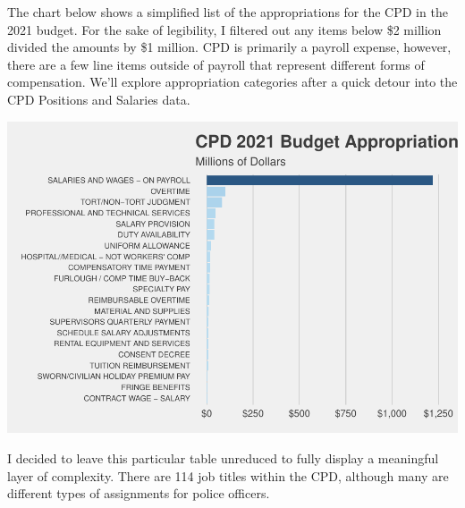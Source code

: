 \documentclass[
]{article}
\begin{document}
The chart below shows a simplified list of the appropriations for the
CPD in the 2021 budget. For the sake of legibility, I filtered out any
items below \$2 million divided the amounts by \$1 million. CPD is
primarily a payroll expense, however, there are a few line items outside
of payroll that represent different forms of compensation. We'll explore
appropriation categories after a quick detour into the CPD Positions and
Salaries data.

\begin{center}\includegraphics{cpd_budget_analysis_files/figure-latex/CPD appropriations by expense type-1} \end{center}

I decided to leave this particular table unreduced to fully display a
meaningful layer of complexity. There are 114 job titles within the CPD,
although many are different types of assignments for police officers.
\end{document}
